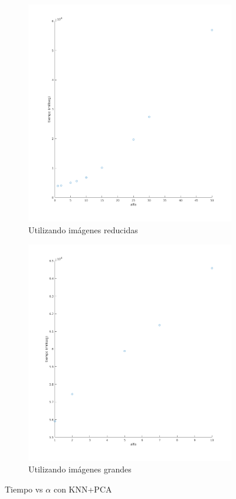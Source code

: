 \begin{figure}[H]
\begin{subfigure}[h]{0.62\linewidth}
\includegraphics[width=\linewidth]{img/alfa_pca_tiempo.png}
\caption{Utilizando imágenes reducidas}
\end{subfigure}
\hfill
\begin{subfigure}[h]{0.62\linewidth}
\includegraphics[width=\linewidth]{img/big_alfa_pca_tiempo.png}
\caption{Utilizando imágenes grandes}
\end{subfigure}%
\caption{Tiempo vs $\alpha$ con KNN+PCA}
\end{figure}

